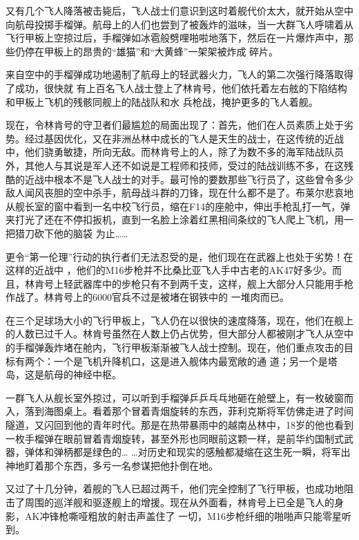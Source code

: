 \documentclass{article}
\begin{document}
又有几个飞人降落被击毙后，飞人战士们意识到这时着舰代价太大，就开始从空中向航母投掷手榴弹。航母上的人们也尝到了被轰炸的滋味，当一大群飞人呼啸着从飞行甲板上空掠过后，手榴弹如冰雹般劈哩啪啦地落下，然后在一片爆炸声中，那些仍停在甲板上的昂贵的“雄猫”和“大黄蜂”一架架被炸成
碎片。 

来自空中的手榴弹成功地遏制了航母上的轻武器火力，飞人的第二次强行降落取得了成功，很快就
\newpage
有上百名飞人战士登上了林肯号，他们依托着左右舷的下陷结构和甲板上飞机的残骸同舰上的陆战队和水
兵枪战，掩护更多的飞人着舰。 

现在，令林肯号的守卫者们最尴尬的局面出现了：首先，他们在人员素质上处于劣势。经过基因优化，又在非洲丛林中成长的飞人是天生的战士，在这传统的近战中，他们骁勇敏捷，所向无敌。而林肯号上的人，除了为数不多的海军陆战队员外，其他人与其说是军人还不如说是工程师和技师，受过的陆战训练不多，在这残酷的近战中根本不是飞人战士的对手。最可怜的要数那些飞行员了，这些曾令多少敌人闻风丧胆的空中杀手，航母战斗群的刀锋，现在什么都不是了。布莱尔悲哀地从舰长室的窗中看到一名中校飞行员，缩在F14的座舱中，伸出手枪乱打一气，弹夹打光了还在不停扣扳机，直到一名脸上涂着红黑相间条纹的飞人爬上飞机，用一把猎刀砍下他的脑袋
为止…… 

更令“第一伦理”行动的执行者们无法忍受的是，他们现在在武器上也处于劣势！在这样的近战中
\newpage
，他们的M16步枪并不比桑比亚飞人手中古老的AK47好多少。而且，林肯号上轻武器库中的步枪只有不到两千支，这样，舰上大部分人只能用手枪作战了。林肯号上的6000官兵不过是被堵在钢铁中的
一堆肉而已。 

在三个足球场大小的飞行甲板上，飞人仍在以很快的速度降落，现在，他们在舰上的人数已过千人。林肯号虽然在人数上仍占优势，但大部分人都被刚才飞人从空中的手榴弹轰炸堵在舱内，飞行甲板渐渐被飞人战士控制。现在，他们重点攻击的目标有两个：一个是飞机升降机口，这是进入舰体内最宽敞的通
道；另一个是塔岛，这是航母的神经中枢。 

一群飞人从舰长室外掠过，可以听到手榴弹乒乒乓乓地砸在舱壁上，有一枚破窗而入，落到海图桌上。看着那个冒着青烟旋转的东西，菲利克斯将军仿佛走进了时间隧道，又闪回到他的青年时代。那是在热带暴雨中的越南丛林中，18岁的他也看到一枚手榴弹在眼前冒着青烟旋转，甚至外形也同眼前这颗一样，是前华约国制式武器，弹体和弹柄都是绿色的…
\newpage
…对历史和现实的感触都凝缩在这生死一瞬，将军出
神地盯着那个东西，多亏一名参谋把他扑倒在地。 

又过了十几分钟，着舰的飞人已超过两千，他们完全控制了飞行甲板，也成功地阻击了周围的巡洋舰和驱逐舰上的增援。现在从外面看，林肯号上已全是飞人的身影，AK冲锋枪嘶哑粗放的射击声盖住了
一切，M16步枪纤细的啪啪声只能零星听到。 
\end{document}
